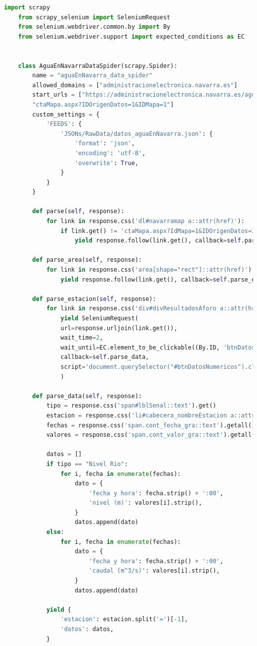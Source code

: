 \begin{lstlisting}[language=Python, caption={Agua en Navarra Data Spider}]
	import scrapy
	from scrapy_selenium import SeleniumRequest
	from selenium.webdriver.common.by import By
	from selenium.webdriver.support import expected_conditions as EC
	
	
	class AguaEnNavarraDataSpider(scrapy.Spider):
		name = "aguaEnNavarra_data_spider"
		allowed_domains = ["administracionelectronica.navarra.es"]
		start_urls = ["https://administracionelectronica.navarra.es/aguaEnNavarra/"
		"ctaMapa.aspx?IDOrigenDatos=1&IDMapa=1"]
		custom_settings = {
			'FEEDS': {
				'JSONs/RawData/datos_aguaEnNavarra.json': {
					'format': 'json',
					'encoding': 'utf-8',
					'overwrite': True,
				}
			}
		}
		
		def parse(self, response):
			for link in response.css('dl#navarramap a::attr(href)'):
				if link.get() != 'ctaMapa.aspx?IdMapa=1&IDOrigenDatos=1':
					yield response.follow(link.get(), callback=self.parse_area)
			
		def parse_area(self, response):
			for link in response.css('area[shape="rect"]::attr(href)'):
				yield response.follow(link.get(), callback=self.parse_estacion)
			
		def parse_estacion(self, response):
			for link in response.css('div#divResultadosAforo a::attr(href)'):
				yield SeleniumRequest(
				url=response.urljoin(link.get()),
				wait_time=2,
				wait_until=EC.element_to_be_clickable((By.ID, 'btnDatosNumericos')),
				callback=self.parse_data,
				script='document.querySelector("#btnDatosNumericos").click()',
				)
			
		def parse_data(self, response):
			tipo = response.css('span#lblSenal::text').get()
			estacion = response.css('li#cabecera_nombreEstacion a::attr(href)').get()
			fechas = response.css('span.cont_fecha_gra::text').getall()
			valores = response.css('span.cont_valor_gra::text').getall()
			
			datos = []
			if tipo == "Nivel Rio":
				for i, fecha in enumerate(fechas):
					dato = {
						'fecha y hora': fecha.strip() + ':00',
						'nivel (m)': valores[i].strip(),
					}
					datos.append(dato)
			else:
				for i, fecha in enumerate(fechas):
					dato = {
						'fecha y hora': fecha.strip() + ':00',
						'caudal (m^3/s)': valores[i].strip(),
					}
					datos.append(dato)
			
			yield {
				'estacion': estacion.split('=')[-1],
				'datos': datos,
			}
\end{lstlisting}

